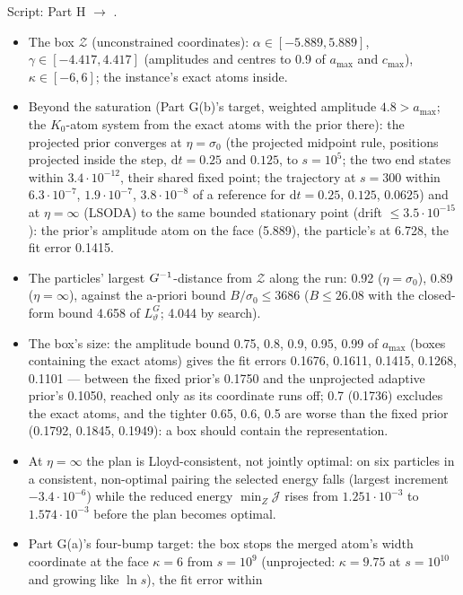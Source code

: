 Script:  Part H $\to$ .
\begin{itemize}
  \item The box $\mathcal{Z}$ (unconstrained coordinates): $\alpha\in[-5.889,5.889]$, $\gamma\in[-4.417,4.417]$
    (amplitudes and centres to 0.9 of $a_{\max}$ and $c_{\max}$), $\kappa\in[-6,6]$; the instance's exact atoms inside.
  \item Beyond the saturation (Part G(b)'s target, weighted amplitude $4.8>a_{\max}$; the $K_0$-atom system from the
    exact atoms with the prior there): the projected prior converges at $\eta=\sigma_0$ (the projected midpoint rule,
    positions projected inside the step, $\mathrm{d}t=0.25$ and $0.125$, to $s=10^5$; the two end states within
    $3.4\cdot10^{-12}$, their shared fixed point; the trajectory at $s=300$ within $6.3\cdot10^{-7}$,
    $1.9\cdot10^{-7}$, $3.8\cdot10^{-8}$ of a reference for $\mathrm{d}t=0.25$, $0.125$, $0.0625$) and at
    $\eta=\infty$ (LSODA) to the same bounded stationary point (drift $\le3.5\cdot10^{-15}$): the prior's amplitude
    atom on the face (5.889), the particle's at 6.728, the fit error 0.1415.
  \item The particles' largest $G^{-1}$-distance from $\mathcal{Z}$ along the run: 0.92 ($\eta=\sigma_0$), 0.89
    ($\eta=\infty$), against the a-priori bound $B/\sigma_0\le3686$ ($B\le26.08$ with the closed-form bound 4.658 of
    $L_\vartheta^G$; 4.044 by search).
  \item The box's size: the amplitude bound 0.75, 0.8, 0.9, 0.95, 0.99 of $a_{\max}$ (boxes containing the exact
    atoms) gives the fit errors 0.1676, 0.1611, 0.1415, 0.1268, 0.1101 --- between the fixed prior's 0.1750 and the
    unprojected adaptive prior's 0.1050, reached only as its coordinate runs off; 0.7 (0.1736) excludes the exact
    atoms, and the tighter 0.65, 0.6, 0.5 are worse than the fixed prior (0.1792, 0.1845, 0.1949): a box should
    contain the representation.
  \item At $\eta=\infty$ the plan is Lloyd-consistent, not jointly optimal: on six particles in a consistent,
    non-optimal pairing the selected energy falls (largest increment $-3.4\cdot10^{-6}$) while the reduced energy
    $\min_Z\mathcal{J}$ rises from $1.251\cdot10^{-3}$ to $1.574\cdot10^{-3}$ before the plan becomes optimal.
  \item Part G(a)'s four-bump target: the box stops the merged atom's width coordinate at the face $\kappa=6$ from
    $s=10^9$ (unprojected: $\kappa=9.75$ at $s=10^{10}$ and growing like $\ln s$), the fit error within

\end{itemize}

